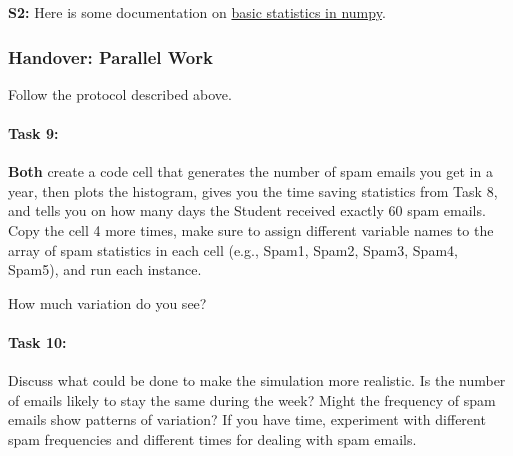 \documentclass{article}
\begin{document}
\textbf{S2:} Here is some documentation on \href{http://docs.scipy.org/doc/numpy/reference/routines.statistics.html}{basic statistics in numpy}.

\subsubsection*{Handover: Parallel Work}
Follow the protocol described above. 

\paragraph{Task 9:} \textbf{Both} create a code cell that generates the number of spam emails you get in a year, then plots the histogram, gives you the time saving statistics from Task 8, and tells you on how many days the Student received exactly 60 spam emails. Copy the cell 4 more times, make sure to assign different variable names to the array of spam statistics in each cell (e.g., Spam1, Spam2, Spam3, Spam4, Spam5), and run each instance.  

How much variation do you see? 

\paragraph{Task 10:} Discuss what could be done to make the simulation more realistic.  Is the number of emails likely to stay the same during the week? Might the frequency of spam emails show patterns of variation? If you have time, experiment with different spam frequencies and different times for dealing with spam emails. 
\end{document}
